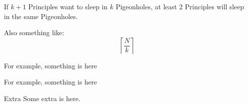 
\begin{DEFINITION}
    \p
    If 
    $k+1$
    Principles want to sleep in 
    $k$
    Pigeonholes, at least 2 Principles will sleep in the same Pigeonholes.
\end{DEFINITION}

\begin{THEOREM}
    \p
    Also something like:
    $$\left \lceil \frac{N}{k} \right \rceil$$
\end{THEOREM}

\p
For example, something is here



\p
For example, something is here



\begin{EXTRA}{Extra}
    Some extra is here.
\end{EXTRA}